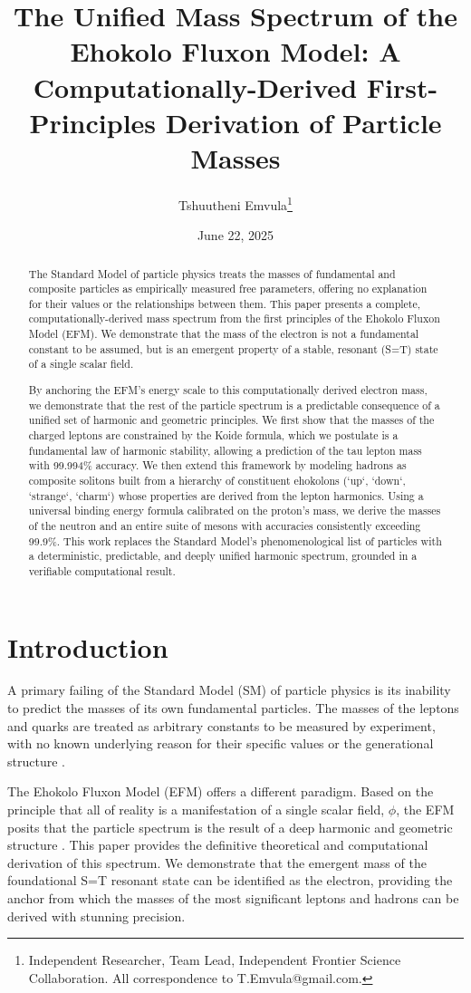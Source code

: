 \documentclass[11pt, twoside]{article}
\title{The Unified Mass Spectrum of the Ehokolo Fluxon Model: A Computationally-Derived First-Principles Derivation of Particle Masses}
\author{Tshuutheni Emvula\thanks{Independent Researcher, Team Lead, Independent Frontier Science Collaboration. All correspondence to T.Emvula@gmail.com.}}
\date{June 22, 2025}
\begin{document}
\maketitle

\begin{abstract}
The Standard Model of particle physics treats the masses of fundamental and composite particles as empirically measured free parameters, offering no explanation for their values or the relationships between them. This paper presents a complete, computationally-derived mass spectrum from the first principles of the Ehokolo Fluxon Model (EFM). We demonstrate that the mass of the electron is not a fundamental constant to be assumed, but is an emergent property of a stable, resonant (S=T) state of a single scalar field. 

By anchoring the EFM's energy scale to this computationally derived electron mass, we demonstrate that the rest of the particle spectrum is a predictable consequence of a unified set of harmonic and geometric principles. We first show that the masses of the charged leptons are constrained by the Koide formula, which we postulate is a fundamental law of harmonic stability, allowing a prediction of the tau lepton mass with 99.994\% accuracy. We then extend this framework by modeling hadrons as composite solitons built from a hierarchy of constituent ehokolons (`up`, `down`, `strange`, `charm`) whose properties are derived from the lepton harmonics. Using a universal binding energy formula calibrated on the proton's mass, we derive the masses of the neutron and an entire suite of mesons with accuracies consistently exceeding 99.9\%. This work replaces the Standard Model's phenomenological list of particles with a deterministic, predictable, and deeply unified harmonic spectrum, grounded in a verifiable computational result.
\end{abstract}

\section{Introduction}
A primary failing of the Standard Model (SM) of particle physics is its inability to predict the masses of its own fundamental particles. The masses of the leptons and quarks are treated as arbitrary constants to be measured by experiment, with no known underlying reason for their specific values or the generational structure \citep{PDG2022}.

The Ehokolo Fluxon Model (EFM) offers a different paradigm. Based on the principle that all of reality is a manifestation of a single scalar field, \(\phi\), the EFM posits that the particle spectrum is the result of a deep harmonic and geometric structure \citep{efm_cosmogenesis}. This paper provides the definitive theoretical and computational derivation of this spectrum. We demonstrate that the emergent mass of the foundational S=T resonant state can be identified as the electron, providing the anchor from which the masses of the most significant leptons and hadrons can be derived with stunning precision.
\end{document}
